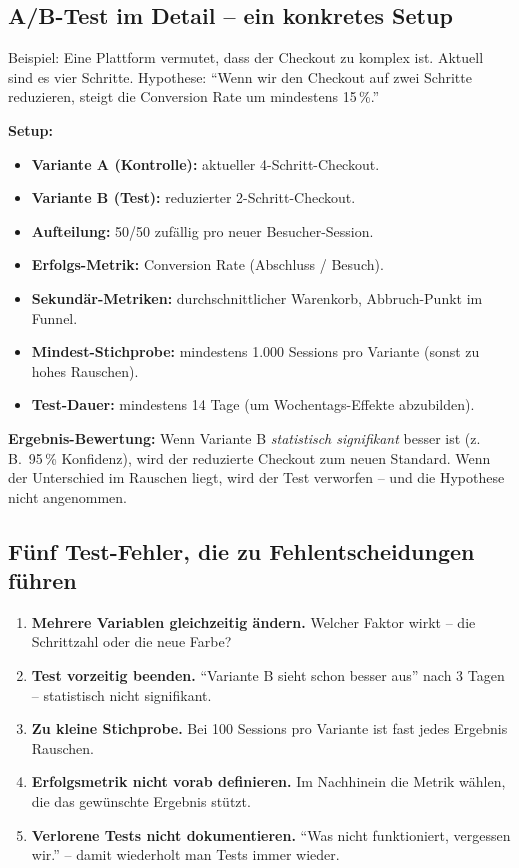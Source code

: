 \documentclass[11pt,a4paper,oneside]{article}
\newcommand{\fachbegriff}[1]{\textbf{#1}}
\begin{document}
\subsection{A/B-Test im Detail -- ein konkretes Setup}

Beispiel: Eine Plattform vermutet, dass der Checkout zu komplex ist. Aktuell sind es vier Schritte. Hypothese: ``Wenn wir den Checkout auf zwei Schritte reduzieren, steigt die Conversion Rate um mindestens 15\,\%.''

\textbf{Setup:}
\begin{itemize}
  \item \textbf{Variante A (Kontrolle):} aktueller 4-Schritt-Checkout.
  \item \textbf{Variante B (Test):} reduzierter 2-Schritt-Checkout.
  \item \textbf{Aufteilung:} 50/50 zufällig pro neuer Besucher-Session.
  \item \textbf{Erfolgs-Metrik:} Conversion Rate (Abschluss / Besuch).
  \item \textbf{Sekundär-Metriken:} durchschnittlicher Warenkorb, Abbruch-Punkt im Funnel.
  \item \textbf{Mindest-Stichprobe:} mindestens 1.000 Sessions pro Variante (sonst zu hohes Rauschen).
  \item \textbf{Test-Dauer:} mindestens 14 Tage (um Wochentags-Effekte abzubilden).
\end{itemize}

\textbf{Ergebnis-Bewertung:} Wenn Variante B \emph{statistisch signifikant} besser ist (z.\,B.\ 95\,\% Konfidenz), wird der reduzierte Checkout zum neuen Standard. Wenn der Unterschied im Rauschen liegt, wird der Test verworfen -- und die Hypothese nicht angenommen.

\subsection{Fünf Test-Fehler, die zu Fehlentscheidungen führen}

\begin{enumerate}
  \item \fachbegriff{Mehrere Variablen gleichzeitig ändern.} Welcher Faktor wirkt -- die Schrittzahl oder die neue Farbe?
  \item \fachbegriff{Test vorzeitig beenden.} ``Variante B sieht schon besser aus'' nach 3 Tagen -- statistisch nicht signifikant.
  \item \fachbegriff{Zu kleine Stichprobe.} Bei 100 Sessions pro Variante ist fast jedes Ergebnis Rauschen.
  \item \fachbegriff{Erfolgsmetrik nicht vorab definieren.} Im Nachhinein die Metrik wählen, die das gewünschte Ergebnis stützt.
  \item \fachbegriff{Verlorene Tests nicht dokumentieren.} ``Was nicht funktioniert, vergessen wir.'' -- damit wiederholt man Tests immer wieder.
\end{enumerate}
\end{document}
